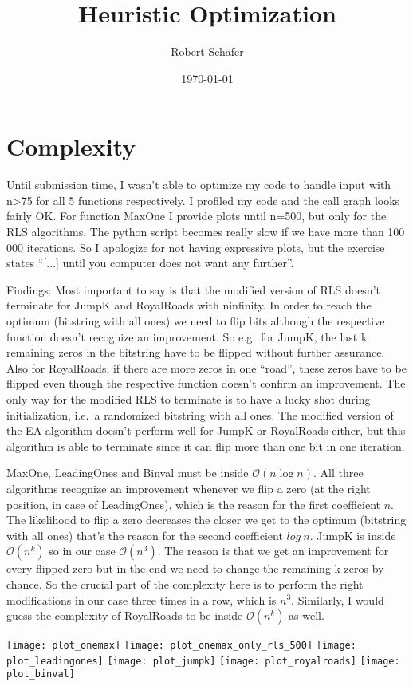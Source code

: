 \documentclass[11pt]{scrartcl}
\title{Heuristic Optimization}
\date{\today}
\author{Robert Schäfer}
\begin{document}
\maketitle

\section{Complexity}
Until submission time, I wasn't able to optimize my code to handle input with n>75 for all 5 functions respectively.
I profiled my code and the call graph looks fairly OK.
For function MaxOne I provide plots until n=500, but only for the RLS algorithms.
The python script becomes really slow if we have more than 100 000 iterations.
So I apologize for not having expressive plots, but the exercise states ``[...] until you computer does not want any further''.

Findings:
Most important to say is that the modified version of RLS doesn't terminate for JumpK and RoyalRoads with n\rightarrow infinity.
In order to reach the optimum (bitstring with all ones) we need to flip bits although the respective function doesn't recognize an improvement.
So e.g.\ for JumpK, the last k remaining zeros in the bitstring have to be flipped without further assurance.
Also for RoyalRoads, if there are more zeros in one ``road'', these zeros have to be flipped even though the respective function doesn't confirm an improvement.
The only way for the modified RLS to terminate is to have a lucky shot during initialization, i.e.\ a randomized bitstring with all ones.
The modified version of the EA algorithm doesn't perform well for JumpK or RoyalRoads either, but this algorithm is able to terminate since it can flip more than one bit in one iteration.


MaxOne, LeadingOnes and Binval must be inside $\mathcal{O}(n\log{}n)$.
All three algorithms recognize an improvement whenever we flip a zero (at the right position, in case of LeadingOnes), which is the reason for the first coefficient $n$.
The likelihood to flip a zero decreases the closer we get to the optimum (bitstring with all ones) that's the reason for the second coefficient $log{}\ n$.
JumpK is inside $\mathcal{O}(n^k)$ so in our case $\mathcal{O}(n^3)$.
The reason is that we get an improvement for every flipped zero but in the end we need to change the remaining k zeros by chance.
So the crucial part of the complexity here is to perform the right modifications in our case three times in a row, which is $n^3$.
Similarly, I would guess the complexity of RoyalRoads to be inside $\mathcal{O}(n^k)$ as well.

\texttt{[image: plot\_onemax]}
\texttt{[image: plot\_onemax\_only\_rls\_500]}
\texttt{[image: plot\_leadingones]}
\texttt{[image: plot\_jumpk]}
\texttt{[image: plot\_royalroads]}
\texttt{[image: plot\_binval]}
\end{document}
